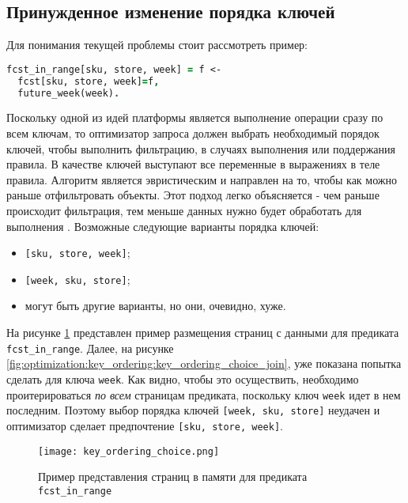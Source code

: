 \subsection{Принужденное изменение порядка ключей}
\label{sec:optimization:key_ordering}

Для понимания текущей проблемы стоит рассмотреть пример:

\begin{lstlisting}[language=Prolog]
fcst_in_range[sku, store, week] = f <-
  fcst[sku, store, week]=f,
  future_week(week).
\end{lstlisting}

Поскольку одной из идей платформы является выполнение операции \join сразу по всем ключам, то оптимизатор запроса должен выбрать необходимый порядок ключей, чтобы выполнить фильтрацию, в случаях выполнения или поддержания правила. В качестве ключей выступают все переменные в выражениях в теле правила. Алгоритм является эвристическим и направлен на то, чтобы как можно раньше отфильтровать объекты. Этот подход легко объясняется - чем раньше происходит фильтрация, тем меньше данных нужно будет обработать для выполнения \join. Возможные следующие варианты порядка ключей:

\begin{itemize}
  \item \lstinline{[sku, store, week]};
  \item \lstinline{[week, sku, store]};
  \item могут быть другие варианты, но они, очевидно, хуже.
\end{itemize}

На рисунке \ref{fig:optimization:key_ordering:key_ordering_choice} представлен пример размещения страниц с данными для предиката \lstinline{fcst_in_range}. Далее, на рисунке \ref{fig:optimization:key_ordering:key_ordering_choice_join}, уже показана попытка сделать \join для ключа \lstinline{week}. Как видно, чтобы это осуществить, необходимо проитерироваться \emph{по всем} страницам предиката, поскольку ключ \lstinline{week} идет в нем последним. Поэтому выбор порядка ключей \lstinline{[week, sku, store]} неудачен и оптимизатор сделает предпочтение \lstinline{[sku, store, week]}.

\begin{figure}
	\centering
	\texttt{[image: key\_ordering\_choice.png]}
	\caption{Пример представления страниц в памяти для предиката \lstinline{fcst_in_range}}
	\label{fig:optimization:key_ordering:key_ordering_choice}
\end{figure}

